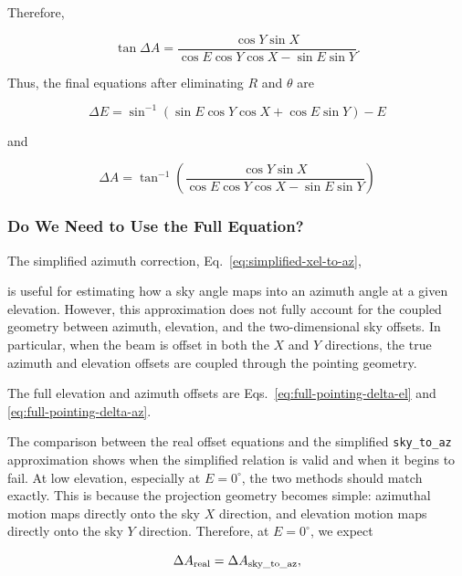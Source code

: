 \documentclass[12pt]{extarticle}
\begin{document}
Therefore,

\begin{equation} \boxed{\tan\Delta A = \frac{\cos Y\sin X}{\cos E\cos Y\cos X - \sin E\sin Y}}. \end{equation}


Thus, the final equations after eliminating $R$ and $\theta$ are

\begin{equation}
\boxed{
\Delta E = \sin^{-1}\left(\sin E\cos Y\cos X + \cos E\sin Y\right) - E
}
\label{eq:full-pointing-delta-el}
\end{equation}

and

\begin{equation}
\boxed{
\Delta A = \tan^{-1}\left(
\frac{\cos{Y}\sin{X}}{\cos{E}\cos{Y}\cos{X}-\sin{E}\sin{Y}}
\right)
}
\label{eq:full-pointing-delta-az}
\end{equation}
\subsubsection{Do We Need to Use the Full Equation?}

The simplified azimuth correction, Eq.~\eqref{eq:simplified-xel-to-az},

is useful for estimating how a sky angle maps into an azimuth angle at a given elevation. However, this approximation does not fully account for the coupled geometry between azimuth, elevation, and the two-dimensional sky offsets. In particular, when the beam is offset in both the $X$ and $Y$ directions, the true azimuth and elevation offsets are coupled through the pointing geometry.

The full elevation and azimuth offsets are Eqs.~\eqref{eq:full-pointing-delta-el} and \eqref{eq:full-pointing-delta-az}.

The comparison between the real offset equations and the simplified \texttt{sky\_to\_az} approximation shows when the simplified relation is valid and when it begins to fail. At low elevation, especially at $E=0^\circ$, the two methods should match exactly. This is because the projection geometry becomes simple: azimuthal motion maps directly onto the sky $X$ direction, and elevation motion maps directly onto the sky $Y$ direction. Therefore, at $E=0^\circ$, we expect

\begin{equation}
\Delta A_{\rm real}
=
\Delta A_{\rm sky\_to\_az},
\end{equation}
\end{document}
